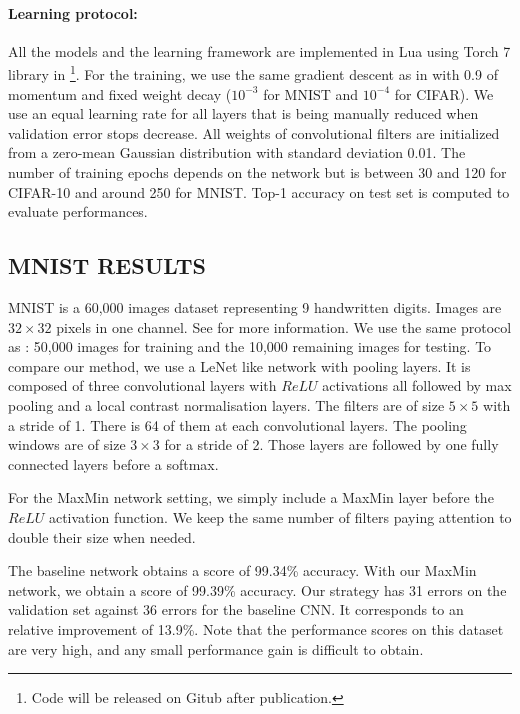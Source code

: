 \documentclass{article}
\begin{document}
\paragraph*{Learning protocol:}
All the models and the learning framework are implemented in Lua using Torch 7 library in \cite{torch} \footnote{Code will be released on Gitub after publication.}. For the training, we use the same gradient descent as in \cite{alexnet} with 0.9 of momentum and fixed weight decay ($10^{-3}$ for MNIST and $10^{-4}$ for CIFAR). We use an equal learning rate for all layers that is being manually reduced when validation error stops decrease. All weights of convolutional filters are initialized from a zero-mean Gaussian distribution with standard deviation 0.01. The number of training epochs depends on the network but is between 30 and 120 for CIFAR-10 and around 250 for MNIST. Top-1 accuracy on test set is computed to evaluate performances.


\subsection{MNIST RESULTS}
MNIST is a 60,000 images dataset representing 9 handwritten digits. Images are $32 \times 32$ pixels in one channel. See \cite{multicolumn} for more information. We use the same protocol as \cite{multicolumn}: 50,000 images for training and the 10,000 remaining images for testing. To compare our method,  we use a LeNet like network with pooling layers. It is composed of three convolutional layers with $ReLU$ activations all followed by max pooling and a local contrast normalisation layers. The filters are of size $5 \times 5$ with a stride of 1. There is 64 of them at each convolutional layers. The pooling windows are of size $3\times 3$ for a stride of 2. Those layers are followed by one fully connected layers before a softmax. 

For the MaxMin network setting, we simply include a MaxMin layer before the $ReLU$ activation function. We keep the same number of filters paying attention to double their size when needed. 

The baseline network obtains a score of 99.34\% accuracy. With our MaxMin network, we obtain a score of 99.39\% accuracy.
Our strategy has 31 errors on the validation set against 36 errors for the baseline CNN. It corresponds to an relative improvement of 13.9\%.    Note that the performance scores on this dataset are very high, and any small performance gain is difficult to obtain.                
                                                                                  
\end{document}
